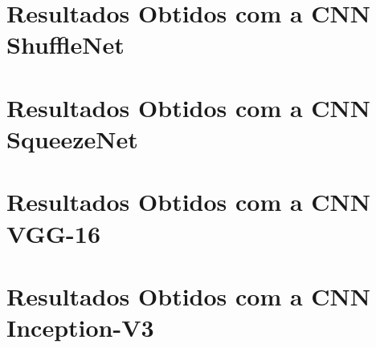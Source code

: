 \section{Resultados Obtidos com a CNN ShuffleNet}
\label{sec:shufflenet}


\section{Resultados Obtidos com a CNN SqueezeNet}
\label{sec:squeezenet}


\section{Resultados Obtidos com a CNN VGG-16}
\label{sec:vgg}


\section{Resultados Obtidos com a CNN Inception-V3}
\label{sec:inception}
